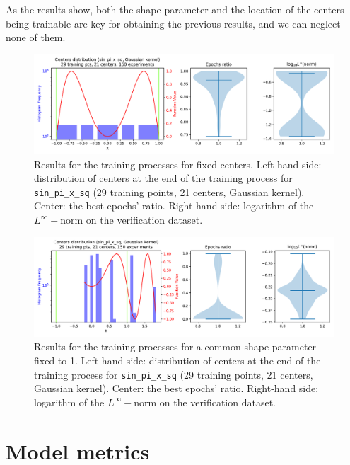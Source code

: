 \documentclass[12pt]{report} %
\begin{document}
As the results show, both the shape parameter and the location of the centers
being trainable are key for obtaining the previous results, and we can neglect
none of them.

\begin{figure}[ht]
  \centering
  \includegraphics[width=\textwidth]
  {imagenes/experiments/1d/sin_pi_x_sq_statistic_interpolation/tr29_c21_sin_pi_x_sq_gaussian_kernel_fixed_centers.pdf}
  \caption{Results for the training processes for fixed centers. Left-hand side: distribution of centers at the end of the training process for
    \texttt{sin\_pi\_x\_sq} (29 training points, 21 centers, Gaussian kernel). Center: the best epochs' ratio.
    Right-hand side: logarithm of the $L^\infty-$norm on the verification dataset.}
  \label{fig:sin-pi-x-sq-statistic-tr29-c29-fixed-centers}
\end{figure}

\begin{figure}[ht]
  \centering
  \includegraphics[width=\textwidth]
  {imagenes/experiments/1d/sin_pi_x_sq_statistic_interpolation/tr29_c21_sin_pi_x_sq_gaussian_kernel_fixed_shapes_1.pdf}
  \caption{Results for the training processes for a common shape parameter fixed to 1. Left-hand side: distribution of centers at the end of the training process for
    \texttt{sin\_pi\_x\_sq} (29 training points, 21 centers, Gaussian kernel). Center: the best epochs' ratio.
    Right-hand side: logarithm of the $L^\infty-$norm on the verification dataset.}
  \label{fig:sin-pi-x-sq-statistic-tr29-c29-fixed-shapes-1}
\end{figure}

\chapter*{Model metrics}
\end{document}
